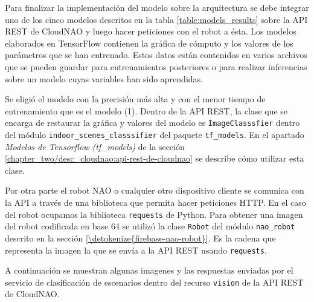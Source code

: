 Para finalizar la implementación del modelo sobre la arquitectura
se debe integrar uno de los cinco modelos descritos en la tabla \ref{table:models_results} sobre la API REST de CloudNAO y luego hacer peticiones con el robot a ésta.
Los modelos elaborados en TensorFlow contienen la gráfica de cómputo
y los valores de los parámetros que se han entrenado. Estos datos
están contenidos en varios archivos que se pueden guardar para
entrenamientos posteriores o para realizar inferencias sobre 
un modelo cuyas variables han sido aprendidas.

Se eligió el modelo con la precisión más alta y con el menor
tiempo de entrenamiento que es el modelo (1). 
Dentro de la API REST, la clase que se encarga de restaurar la gráfica y valores del modelo
es \texttt{ImageClasssfier} dentro del módulo \texttt{indoor\_scenes\_classsifier} del paquete \texttt{tf\_models}.
En el apartado \textit{Modelos de Tensorflow (tf\_models)}
de la sección \ref{chapter_two/desc_cloudnao:api-rest-de-cloudnao}
se describe cómo utilizar esta clase.

Por otra parte el robot NAO o cualquier otro
dispositivo cliente se comunica con la API a través
de una biblioteca que permita hacer peticiones 
HTTP. En el caso del robot ocupamos la biblioteca
\texttt{requests} de Python. Para obtener una imagen 
del robot codificada en base 64 se utilizó la clase \texttt{Robot}
del módulo \texttt{nao\_robot} descrito en la sección
\ref{\detokenize{firebase-nao-robot}}. Es la cadena
que representa la imagen la que se envía a la API REST usando
\texttt{requests}.

A continuación se muestran algunas imagenes y las
respuestas enviadas por el servicio de clasificación
de escenarios dentro del recurso \texttt{vision} de la
API REST de CloudNAO.









 

